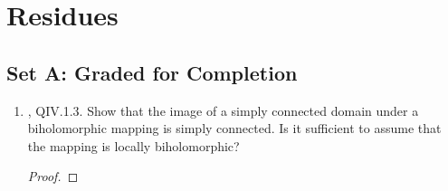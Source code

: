 \documentclass[../psets.tex]{subfiles}
\begin{document}
\section{Residues}
\subsection*{Set A: Graded for Completion}
\begin{enumerate}[ref={A.\arabic*}]
    \item {}\textcite{bib:FischerLieb}, QIV.1.3. Show that the image of a simply connected domain under a biholomorphic mapping is simply connected. Is it sufficient to assume that the mapping is locally biholomorphic?
    \begin{proof}
        



\end{proof}
\end{enumerate}
\end{document}
